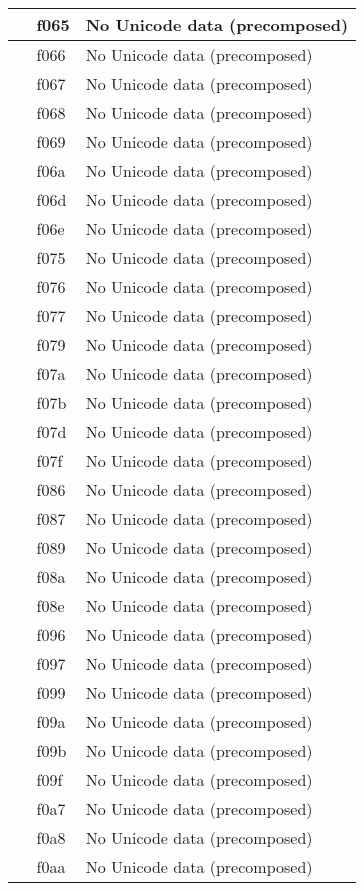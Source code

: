 \documentclass[12pt,letterpaper,openany]{book}
\begin{document}
\begin{center}
\begin{supertabular}{|m{0.25in}|m{0.5in}|m{4in}|}
 & f065 & No Unicode data (precomposed)\\\hline
 & f066 & No Unicode data (precomposed)\\\hline
 & f067 & No Unicode data (precomposed)\\\hline
 & f068 & No Unicode data (precomposed)\\\hline
 & f069 & No Unicode data (precomposed)\\\hline
 & f06a & No Unicode data (precomposed)\\\hline
 & f06d & No Unicode data (precomposed)\\\hline
 & f06e & No Unicode data (precomposed)\\\hline
 & f075 & No Unicode data (precomposed)\\\hline
 & f076 & No Unicode data (precomposed)\\\hline
 & f077 & No Unicode data (precomposed)\\\hline
 & f079 & No Unicode data (precomposed)\\\hline
 & f07a & No Unicode data (precomposed)\\\hline
 & f07b & No Unicode data (precomposed)\\\hline
 & f07d & No Unicode data (precomposed)\\\hline
 & f07f & No Unicode data (precomposed)\\\hline
 & f086 & No Unicode data (precomposed)\\\hline
 & f087 & No Unicode data (precomposed)\\\hline
 & f089 & No Unicode data (precomposed)\\\hline
 & f08a & No Unicode data (precomposed)\\\hline
 & f08e & No Unicode data (precomposed)\\\hline
 & f096 & No Unicode data (precomposed)\\\hline
 & f097 & No Unicode data (precomposed)\\\hline
 & f099 & No Unicode data (precomposed)\\\hline
 & f09a & No Unicode data (precomposed)\\\hline
 & f09b & No Unicode data (precomposed)\\\hline
 & f09f & No Unicode data (precomposed)\\\hline
 & f0a7 & No Unicode data (precomposed)\\\hline
 & f0a8 & No Unicode data (precomposed)\\\hline
 & f0aa & No Unicode data (precomposed)\\\hline

\end{supertabular}
\end{center}
\end{document}
